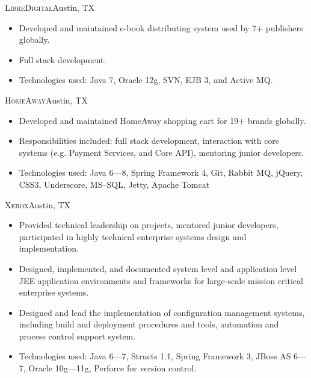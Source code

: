 \documentclass[11pt,letterpaper,sans]{moderncv}
\begin{document}
     {\textsc{LibreDigital}}{Austin, TX}{}
     {\begin{itemize}
         \item Developed and maintained e-book distributing system
               used by 7+ publishers globally.
         \item Full stack development.
         \item Technologies used: Java 7, Oracle 12g, SVN, EJB 3, and
               Active MQ.
     \end{itemize}}

     {\textsc{HomeAway}}{Austin, TX}{}
     {\begin{itemize}
         \item Developed and maintained HomeAway shopping cart for 19+
               brands globally.
         \item Responsibilities included: full stack development, interaction
               with core systems (e.g. Payment Services, and Core API),
               mentoring junior developers.
         \item Technologies used: Java 6---8, Spring Framework 4, Git, Rabbit
               MQ, jQuery, CSS3, Underscore, MS--SQL, Jetty, Apache Tomcat
     \end{itemize}}

     {\textsc{Xerox}}{Austin, TX}{}
     {\begin{itemize}
         \item Provided technical leadership on projects, mentored junior
               developers, participated in highly technical enterprise
               systems design and implementation.
         \item Designed, implemented, and documented system level and
               application level JEE application environments and frameworks
               for large-scale mission critical enterprise systems.
         \item Designed and lead the implementation of configuration
               management systems, including build and deployment procedures
               and tools, automation and process control support system.
         \item Technologies used: Java 6---7, Structs 1.1, Spring Framework
               3, JBoss AS 6---7, Oracle 10g---11g, Perforce for version
               control.
     \end{itemize}}
\end{document}
